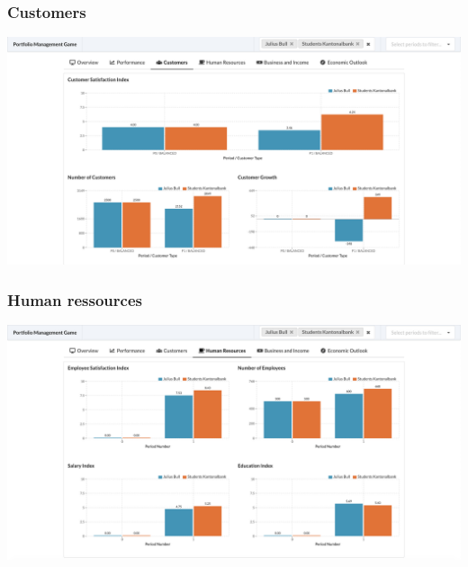 \subsubsection{Customers}
\begin{center}
  \includegraphics[scale=0.2]{img/application-overview/reports/03_customers.png}
\end{center}

\subsubsection{Human ressources}
\begin{center}
  \includegraphics[scale=0.2]{img/application-overview/reports/04_hr.png}
\end{center}


